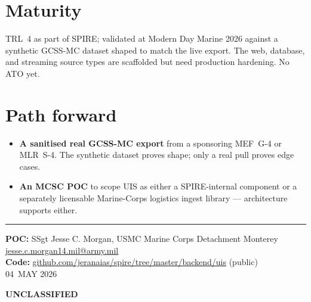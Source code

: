 \documentclass[10pt]{extarticle}
\newcommand{\classband}[0]{%
  \begin{center}\textbf{UNCLASSIFIED}\end{center}%
}
\begin{document}
\section*{Maturity}
TRL~4 as part of SPIRE; validated at Modern Day Marine 2026 against a
synthetic GCSS-MC dataset shaped to match the live export. The web,
database, and streaming source types are scaffolded but need production
hardening. No ATO yet.

\section*{Path forward}
\begin{itemize}
  \item \textbf{A sanitised real GCSS-MC export} from a sponsoring MEF~G-4
    or MLR~S-4. The synthetic dataset proves shape; only a real pull
    proves edge cases.
  \item \textbf{An MCSC POC} to scope UIS as either a SPIRE-internal
    component or a separately licensable Marine-Corps logistics ingest
    library --- architecture supports either.
\end{itemize}

\vfill

\noindent\rule{\linewidth}{0.4pt}

\begin{center}
{\fontsize{9.5pt}{11pt}\selectfont
\textbf{POC:} SSgt Jesse C. Morgan, USMC {\textperiodcentered} Marine Corps Detachment Monterey {\textperiodcentered} \href{mailto:jesse.c.morgan14.mil@army.mil}{jesse.c.morgan14.mil@army.mil}\\
\textbf{Code:} \href{https://github.com/jeranaias/spire/tree/master/backend/uis}{github.com/jeranaias/spire/tree/master/backend/uis} (public)\\[3pt]
{\color{spireMuted}04~MAY 2026}
}
\end{center}

\classband
\end{document}
